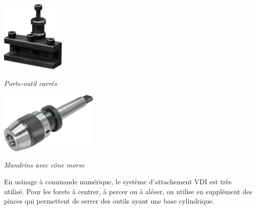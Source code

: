 \documentclass[11pt,oneside]{article}
\begin{document}
\begin{minipage}[c]{.45\linewidth}
\begin{center}
\includegraphics[height=3.5cm]{png/po_2}

\textit{Porte-outil carrés}
\end{center}
\end{minipage}\hfill
\begin{minipage}[c]{.45\linewidth}
\begin{center}
\includegraphics[height=3cm]{png/po_1}

\textit{Mandrins avec cône morse}
\end{center}
\end{minipage}


En usinage à commande numérique, le système d'attachement VDI est très utilisé. Pour les forets à centrer, à percer ou à aléser, on utilise en supplément des pinces qui permettent de serrer des outils ayant une base cylindrique. 
\end{document}
